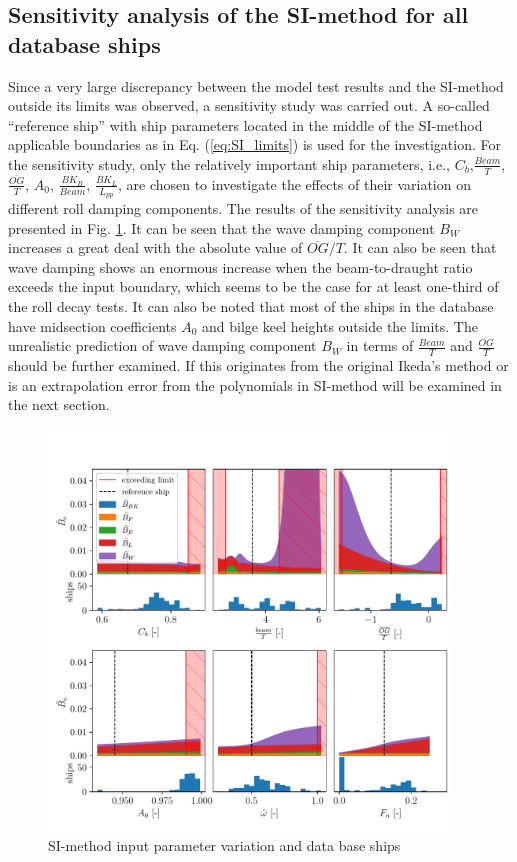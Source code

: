 \subsection{Sensitivity analysis of the SI-method for all database ships}
\label{se:accuracy_SI_method}
Since a very large discrepancy between the model test results and the SI-method outside its limits was observed, a sensitivity study was carried out. A so-called ``reference ship'' with ship parameters located in the middle of the SI-method applicable boundaries as in Eq. (\ref{eq:SI_limits}) is used for the investigation. For the sensitivity study, only the relatively important ship parameters, i.e., $C_b$,$\frac{Beam}{T}$, $\frac{\overline{OG}}{T}$, $A_0$, $\frac{BK_B}{Beam}$, $\frac{BK_L}{L_{pp}}$, are chosen to investigate the effects of their variation on different roll damping components. The results of the sensitivity analysis are presented in Fig. \ref{fig:SI_sensitivity}. It can be seen that the wave damping component $B_W$ increases a great deal with the absolute value of $\overline{OG}/T$. It can also be seen that wave damping shows an enormous increase when the beam-to-draught ratio exceeds the input boundary, which seems to be the case for at least one-third of the roll decay tests. It can also be noted that most of the ships in the database have midsection coefficients $A_0$ and bilge keel heights outside the limits. The unrealistic prediction of wave damping component $B_W$ in terms of $\frac{Beam}{T}$ and $\frac{\overline{OG}}{T}$ should be further examined. If this originates from the original Ikeda's method or is an extrapolation error from the polynomials in SI-method will be examined in the next section.

\begin{figure}[H]
    \centering
    \includegraphics[width=0.95\textwidth]{figures/SI-sensitivity.pdf}
        \vspace{-0.1cm}
    \caption{SI-method input parameter variation and data base ships}
    \label{fig:SI_sensitivity}
\end{figure}
